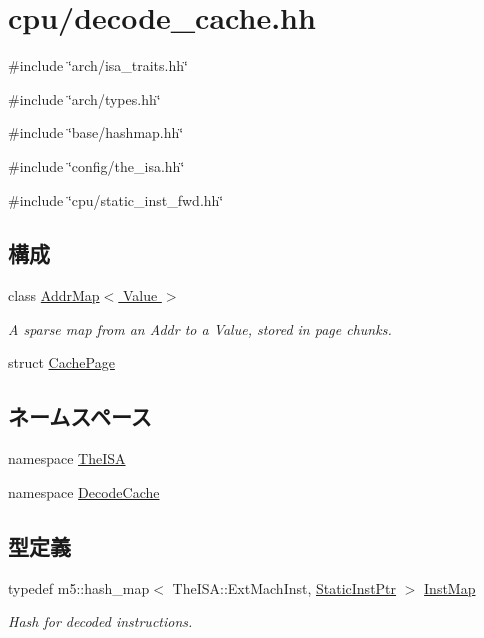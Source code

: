 \hypertarget{cpu_2decode__cache_8hh}{
\section{cpu/decode\_\-cache.hh}
\label{cpu_2decode__cache_8hh}
}
{\ttfamily \#include \char`\"{}arch/isa\_\-traits.hh\char`\"{}}\par
{\ttfamily \#include \char`\"{}arch/types.hh\char`\"{}}\par
{\ttfamily \#include \char`\"{}base/hashmap.hh\char`\"{}}\par
{\ttfamily \#include \char`\"{}config/the\_\-isa.hh\char`\"{}}\par
{\ttfamily \#include \char`\"{}cpu/static\_\-inst\_\-fwd.hh\char`\"{}}\par
\subsection*{構成}
\begin{DoxyCompactItemize}
\item 
class \hyperlink{classDecodeCache_1_1AddrMap}{AddrMap$<$ Value $>$}
\begin{DoxyCompactList}\small\item\em A sparse map from an Addr to a Value, stored in page chunks. \item\end{DoxyCompactList}\item 
struct \hyperlink{structDecodeCache_1_1AddrMap_1_1CachePage}{CachePage}
\end{DoxyCompactItemize}
\subsection*{ネームスペース}
\begin{DoxyCompactItemize}
\item 
namespace \hyperlink{namespaceTheISA}{TheISA}
\item 
namespace \hyperlink{namespaceDecodeCache}{DecodeCache}
\end{DoxyCompactItemize}
\subsection*{型定義}
\begin{DoxyCompactItemize}
\item 
typedef m5::hash\_\-map$<$ TheISA::ExtMachInst, \hyperlink{classRefCountingPtr}{StaticInstPtr} $>$ \hyperlink{namespaceDecodeCache_ac4aa7140c72815d25936c8dcf04191f1}{InstMap}
\begin{DoxyCompactList}\small\item\em Hash for decoded instructions. \item\end{DoxyCompactList}\end{DoxyCompactItemize}
